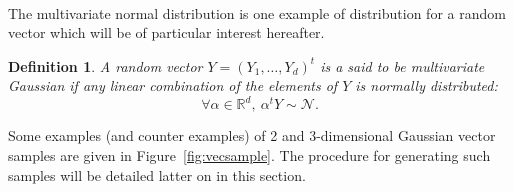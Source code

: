 \documentclass[twoside,openright]{report}
\newtheorem{definition}{Definition}
\begin{document}
\paragraph{}
The multivariate normal distribution is one example of distribution for a random vector which will be of particular interest hereafter. 
\begin{definition}
A random vector $Y=(Y_1, \dots, Y_d)^t$ is a said to be multivariate Gaussian if any linear combination of the elements of $Y$ is normally distributed:
\begin{equation}
\forall \alpha \in \mathds{R}^d,\ \alpha^t Y \sim \mathcal{N}.
\end{equation}  
\end{definition}
Some examples (and counter examples) of 2 and 3-dimensional Gaussian vector samples are given in Figure~\ref{fig:vecsample}. The procedure for generating such samples will be detailed latter on in this section.
\end{document}
